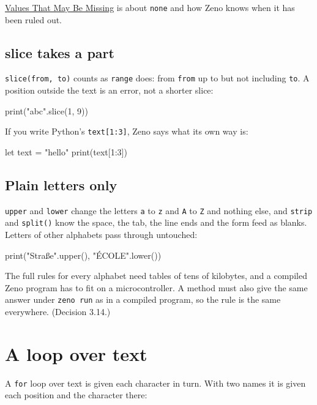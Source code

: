 \hyperref[ch-none]{Values That May Be Missing} is about \verb|none| and
how Zeno knows when it has been ruled out.

\subsection{slice takes a part}

\verb|slice(from, to)| counts as \verb|range| does: from \verb|from| up
to but not including \verb|to|. A position outside the text is an
error, not a shorter slice:

\begin{zeno}[fails=yes]
print("abc".slice(1, 9))
\end{zeno}

If you write Python's \verb|text[1:3]|, Zeno says what its own way is:

\begin{zeno}[fails=yes]
let text = "hello"
print(text[1:3])
\end{zeno}

\subsection{Plain letters only}

\verb|upper| and \verb|lower| change the letters \verb|a| to \verb|z|
and \verb|A| to \verb|Z| and nothing else, and \verb|strip| and
\verb|split()| know the space, the tab, the line ends and the form
feed as blanks. Letters of other alphabets pass through untouched:

\begin{zeno}
print("Straße".upper(), "ÉCOLE".lower())
\end{zeno}

\begin{why}
The full rules for every alphabet need tables of tens of kilobytes,
and a compiled Zeno program has to fit on a microcontroller. A method
must also give the same answer under \verb|zeno run| as in a compiled
program, so the rule is the same everywhere. (Decision 3.14.)
\end{why}

\section{A loop over text}

A \verb|for| loop over text is given each character in turn. With two
names it is given each position and the character there:

